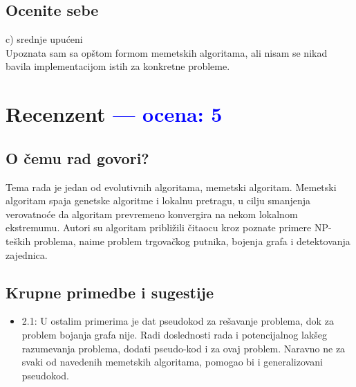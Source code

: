 \documentclass[a4paper]{report}
\newcommand{\odgovor}[1]{\textcolor{blue}{#1}}
\begin{document}
\section{Ocenite sebe}
 c) srednje upućeni \\
 Upoznata sam sa opštom formom memetskih algoritama, ali nisam se nikad bavila implementacijom istih za konkretne probleme.


\chapter{Recenzent \odgovor{--- ocena: 5} }


\section{O čemu rad govori?}
Tema rada je jedan od evolutivnih algoritama, memetski algoritam. Memetski algoritam spaja genetske algoritme i lokalnu pretragu, u cilju smanjenja verovatnoće da algoritam prevremeno konvergira na nekom lokalnom ekstremumu.  Autori su algoritam približili čitaocu kroz poznate primere NP-teških problema, naime problem trgovačkog putnika, bojenja grafa i detektovanja zajednica.

\section{Krupne primedbe i sugestije}
\begin{itemize}
    \item 2.1: U ostalim primerima je dat pseudokod za rešavanje problema, dok za problem bojanja grafa nije. Radi doslednosti rada i potencijalnog lakšeg razumevanja problema, dodati pseudo-kod i za ovaj problem. Naravno ne za svaki od navedenih memetskih algoritama, pomogao bi i generalizovani pseudokod.
\end{itemize}
\end{document}
